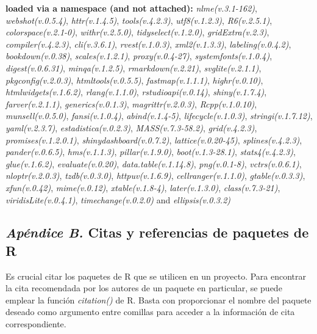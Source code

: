 \documentclass[
  11pt,
  bookmarksnumbered]{article}
\begin{document}
\textbf{loaded via a namespace (and not attached):}
\emph{nlme(v.3.1-162)}, \emph{webshot(v.0.5.4)}, \emph{httr(v.1.4.5)}, \emph{tools(v.4.2.3)}, \emph{utf8(v.1.2.3)}, \emph{R6(v.2.5.1)}, \emph{colorspace(v.2.1-0)}, \emph{withr(v.2.5.0)}, \emph{tidyselect(v.1.2.0)}, \emph{gridExtra(v.2.3)}, \emph{compiler(v.4.2.3)}, \emph{cli(v.3.6.1)}, \emph{rvest(v.1.0.3)}, \emph{xml2(v.1.3.3)}, \emph{labeling(v.0.4.2)}, \emph{bookdown(v.0.38)}, \emph{scales(v.1.2.1)}, \emph{proxy(v.0.4-27)}, \emph{systemfonts(v.1.0.4)}, \emph{digest(v.0.6.31)}, \emph{minqa(v.1.2.5)}, \emph{rmarkdown(v.2.21)}, \emph{svglite(v.2.1.1)}, \emph{pkgconfig(v.2.0.3)}, \emph{htmltools(v.0.5.5)}, \emph{fastmap(v.1.1.1)}, \emph{highr(v.0.10)}, \emph{htmlwidgets(v.1.6.2)}, \emph{rlang(v.1.1.0)}, \emph{rstudioapi(v.0.14)}, \emph{shiny(v.1.7.4)}, \emph{farver(v.2.1.1)}, \emph{generics(v.0.1.3)}, \emph{magrittr(v.2.0.3)}, \emph{Rcpp(v.1.0.10)}, \emph{munsell(v.0.5.0)}, \emph{fansi(v.1.0.4)}, \emph{abind(v.1.4-5)}, \emph{lifecycle(v.1.0.3)}, \emph{stringi(v.1.7.12)}, \emph{yaml(v.2.3.7)}, \emph{estadistica(v.0.2.3)}, \emph{MASS(v.7.3-58.2)}, \emph{grid(v.4.2.3)}, \emph{promises(v.1.2.0.1)}, \emph{shinydashboard(v.0.7.2)}, \emph{lattice(v.0.20-45)}, \emph{splines(v.4.2.3)}, \emph{pander(v.0.6.5)}, \emph{hms(v.1.1.3)}, \emph{pillar(v.1.9.0)}, \emph{boot(v.1.3-28.1)}, \emph{stats4(v.4.2.3)}, \emph{glue(v.1.6.2)}, \emph{evaluate(v.0.20)}, \emph{data.table(v.1.14.8)}, \emph{png(v.0.1-8)}, \emph{vctrs(v.0.6.1)}, \emph{nloptr(v.2.0.3)}, \emph{tzdb(v.0.3.0)}, \emph{httpuv(v.1.6.9)}, \emph{cellranger(v.1.1.0)}, \emph{gtable(v.0.3.3)}, \emph{xfun(v.0.42)}, \emph{mime(v.0.12)}, \emph{xtable(v.1.8-4)}, \emph{later(v.1.3.0)}, \emph{class(v.7.3-21)}, \emph{viridisLite(v.0.4.1)}, \emph{timechange(v.0.2.0)} and \emph{ellipsis(v.0.3.2)}

\hypertarget{paquetes-cit}{%
\subsection*{\texorpdfstring{\emph{Apéndice B.} Citas y referencias de paquetes de R}{Apéndice B. Citas y referencias de paquetes de R}}\label{paquetes-cit}}

Es crucial citar los paquetes de R que se utilicen en un proyecto.
Para encontrar la cita recomendada por los autores de un paquete en particular, se puede emplear la función \emph{citation()} de R.
Basta con proporcionar el nombre del paquete deseado como argumento entre comillas para acceder a la información de cita correspondiente.
\end{document}
